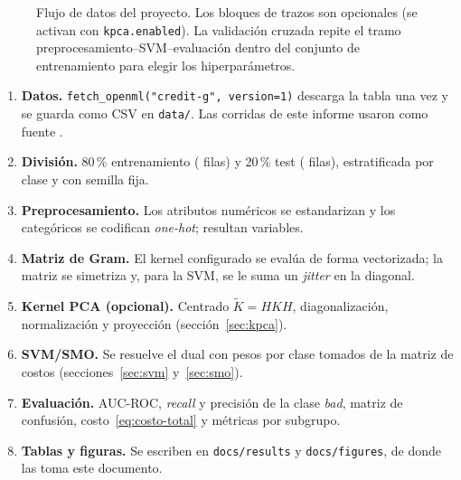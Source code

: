 \documentclass[11pt,a4paper]{article}
\newcommand{\Kc}{\widetilde{K}}                   %
\newcommand{\bad}{\emph{bad}}
\newcommand{\code}[1]{\texttt{#1}}
\theoremstyle{plain}
\theoremstyle{definition}
\theoremstyle{remark}
\numberwithin{equation}{section}
\begin{document}
\begin{figure}[htbp]
  \caption{Flujo de datos del proyecto. Los bloques de trazos son opcionales (se activan con
  \code{kpca.enabled}). La validación cruzada repite el tramo preprocesamiento--SVM--evaluación
  dentro del conjunto de entrenamiento para elegir los hiperparámetros.}
  \label{fig:flujo}
\end{figure}

\begin{enumerate}
  \item \textbf{Datos.} \code{fetch\_openml("credit-g", version=1)} descarga la tabla una vez
        y se guarda como CSV en \code{data/}. Las corridas de este informe usaron como fuente
        \ResDataSource.
  \item \textbf{División.} 80\,\% entrenamiento (\ResNTrain{} filas) y 20\,\% test
        (\ResNTest{} filas), estratificada por clase y con semilla fija.
  \item \textbf{Preprocesamiento.} Los atributos numéricos se estandarizan y los categóricos
        se codifican \emph{one-hot}; resultan \ResNFeatures{} variables.
  \item \textbf{Matriz de Gram.} El kernel configurado se evalúa de forma vectorizada; la
        matriz se simetriza y, para la SVM, se le suma un \emph{jitter} en la diagonal.
  \item \textbf{Kernel PCA (opcional).} Centrado $\Kc=HKH$, diagonalización, normalización y
        proyección (sección~\ref{sec:kpca}).
  \item \textbf{SVM/SMO.} Se resuelve el dual con pesos por clase tomados de la matriz de
        costos (secciones~\ref{sec:svm} y~\ref{sec:smo}).
  \item \textbf{Evaluación.} AUC-ROC, \emph{recall} y precisión de la clase \bad, matriz de
        confusión, costo~\eqref{eq:costo-total} y métricas por subgrupo.
  \item \textbf{Tablas y figuras.} Se escriben en \code{docs/results} y \code{docs/figures},
        de donde las toma este documento.
\end{enumerate}
\end{document}

